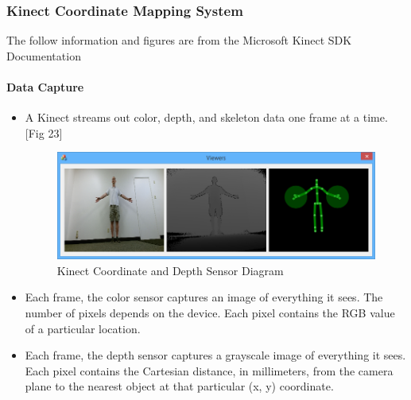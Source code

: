 \documentclass[a4paper,10pt]{article}
\begin{document}
\subsubsection{Kinect Coordinate Mapping System}
The follow information and figures are from the Microsoft Kinect SDK Documentation \cite{msdnKinect}
\paragraph{Data Capture}
\begin{itemize}

\item A Kinect streams out color, depth, and skeleton data one frame at a time. [Fig 23] 
	\begin{figure}[H]
		\centerline{\includegraphics[scale=0.6]{kinectCoord.png}}
		\caption{Kinect Coordinate and Depth Sensor Diagram}
		\label{fig:kinectCoord}
	\end{figure}

\item Each frame, the color sensor captures an image of everything it sees. The number of pixels depends on the device. Each pixel contains the RGB value of a particular location.

\item Each frame, the depth sensor captures a grayscale image of everything it sees. Each pixel contains the Cartesian distance, in millimeters, from the camera plane to the nearest 
object at that particular (x, y) coordinate.


\end{itemize}
\end{document}
